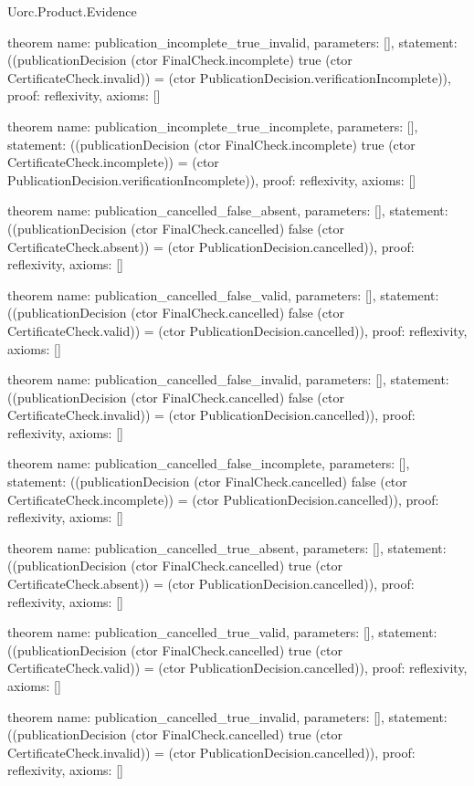 \begin{lexlean}{Uorc.Product.Evidence}
\begin{semanticmodule}
theorem{
  name: publication_incomplete_true_invalid,
  parameters: [],
  statement: ((publicationDecision (ctor FinalCheck.incomplete) true (ctor CertificateCheck.invalid)) = (ctor PublicationDecision.verificationIncomplete)),
  proof: reflexivity{},
  axioms: []
}

theorem{
  name: publication_incomplete_true_incomplete,
  parameters: [],
  statement: ((publicationDecision (ctor FinalCheck.incomplete) true (ctor CertificateCheck.incomplete)) = (ctor PublicationDecision.verificationIncomplete)),
  proof: reflexivity{},
  axioms: []
}

theorem{
  name: publication_cancelled_false_absent,
  parameters: [],
  statement: ((publicationDecision (ctor FinalCheck.cancelled) false (ctor CertificateCheck.absent)) = (ctor PublicationDecision.cancelled)),
  proof: reflexivity{},
  axioms: []
}

theorem{
  name: publication_cancelled_false_valid,
  parameters: [],
  statement: ((publicationDecision (ctor FinalCheck.cancelled) false (ctor CertificateCheck.valid)) = (ctor PublicationDecision.cancelled)),
  proof: reflexivity{},
  axioms: []
}

theorem{
  name: publication_cancelled_false_invalid,
  parameters: [],
  statement: ((publicationDecision (ctor FinalCheck.cancelled) false (ctor CertificateCheck.invalid)) = (ctor PublicationDecision.cancelled)),
  proof: reflexivity{},
  axioms: []
}

theorem{
  name: publication_cancelled_false_incomplete,
  parameters: [],
  statement: ((publicationDecision (ctor FinalCheck.cancelled) false (ctor CertificateCheck.incomplete)) = (ctor PublicationDecision.cancelled)),
  proof: reflexivity{},
  axioms: []
}

theorem{
  name: publication_cancelled_true_absent,
  parameters: [],
  statement: ((publicationDecision (ctor FinalCheck.cancelled) true (ctor CertificateCheck.absent)) = (ctor PublicationDecision.cancelled)),
  proof: reflexivity{},
  axioms: []
}

theorem{
  name: publication_cancelled_true_valid,
  parameters: [],
  statement: ((publicationDecision (ctor FinalCheck.cancelled) true (ctor CertificateCheck.valid)) = (ctor PublicationDecision.cancelled)),
  proof: reflexivity{},
  axioms: []
}

theorem{
  name: publication_cancelled_true_invalid,
  parameters: [],
  statement: ((publicationDecision (ctor FinalCheck.cancelled) true (ctor CertificateCheck.invalid)) = (ctor PublicationDecision.cancelled)),
  proof: reflexivity{},
  axioms: []
}


\end{semanticmodule}
\end{lexlean}
